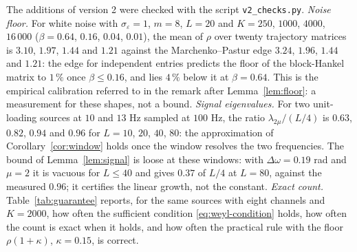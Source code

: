 \documentclass{article}
\begin{document}
The additions of version 2 were checked with the script \texttt{v2\_checks.py}. \emph{Noise floor.} For white noise with $\sigma_\varepsilon = 1$, $m = 8$, $L = 20$ and $K = 250$, $1000$, $4000$, $16\,000$ ($\beta = 0.64$, $0.16$, $0.04$, $0.01$), the mean of $\rho$ over twenty trajectory matrices is $3.10$, $1.97$, $1.44$ and $1.21$ against the Marchenko--Pastur edge $3.24$, $1.96$, $1.44$ and $1.21$: the edge for independent entries predicts the floor of the block-Hankel matrix to $1\,\%$ once $\beta \le 0.16$, and lies $4\,\%$ below it at $\beta = 0.64$. This is the empirical calibration referred to in the remark after Lemma~\ref{lem:floor}: a measurement for these shapes, not a bound. \emph{Signal eigenvalues.} For two unit-loading sources at $10$ and $13$ Hz sampled at $100$ Hz, the ratio $\lambda_{2\mu} / (L/4)$ is $0.63$, $0.82$, $0.94$ and $0.96$ for $L = 10$, $20$, $40$, $80$: the approximation of Corollary~\ref{cor:window} holds once the window resolves the two frequencies. The bound of Lemma~\ref{lem:signal} is loose at these windows: with $\Delta\omega = 0.19$ rad and $\mu = 2$ it is vacuous for $L \le 40$ and gives $0.37$ of $L/4$ at $L = 80$, against the measured $0.96$; it certifies the linear growth, not the constant. \emph{Exact count.} Table~\ref{tab:guarantee} reports, for the same sources with eight channels and $K = 2000$, how often the sufficient condition \eqref{eq:weyl-condition} holds, how often the count is exact when it holds, and how often the practical rule with the floor $\rho(1 + \kappa)$, $\kappa = 0.15$, is correct.
\end{document}
